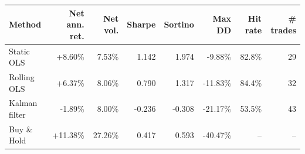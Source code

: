 \begin{tabular}{lrrrrrrr}
\toprule
Method & Net ann. ret. & Net vol. & Sharpe & Sortino & Max DD & Hit rate & \# trades\\
\midrule
Static OLS & +8.60\% & 7.53\% & 1.142 & 1.974 & -9.88\% & 82.8\% & 29\\
Rolling OLS & +6.37\% & 8.06\% & 0.790 & 1.317 & -11.83\% & 84.4\% & 32\\
Kalman filter & -1.89\% & 8.00\% & -0.236 & -0.308 & -21.17\% & 53.5\% & 43\\
Buy \& Hold & +11.38\% & 27.26\% & 0.417 & 0.593 & -40.47\% & -- & --\\
\bottomrule
\end{tabular}
